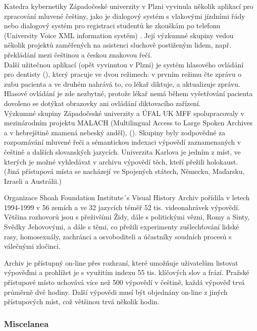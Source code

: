 \begin{multicols}{2}
Katedra kybernetiky Západočeské univerzity v Plzni vyvinula několik aplikací pro zpracování mluvené češtiny, jako je dialogový systém s vlakovými jízdními řády nebo dialogový systém pro registraci studentů ke zkouškám po telefonu (University Voice XML information systém) \cite{Note24}. Její výzkumné skupiny vedou několik projektů zaměřených na asistenci sluchově postiženým lidem, např. překládání mezi češtinou a českou znakovou řečí.\\
Další užitečnou aplikací (opět vyvinutou v Plzni) je systém hlasového ovládání pro dentisty (\cite{Nagy2008}), který pracuje ve dvou režimech: v prvním režimu čte zprávu o zubu pacienta a ve druhém nahrává to, co lékař diktuje, a aktualizuje zprávu. Hlasové ovládání je zde nezbytné, protože lékař nemá během vyšetřování pacienta dovoleno se dotýkat obrazovky ani ovládání diktovacího zařízení.\\
Výzkumné skupiny Západočeské univerzity a ÚFAL UK MFF spolupracovaly v mezinárodním projektu MALACH (Multilingual Access to Large Spoken Archives a v hebrejštině znamená nebeský anděl), (\cite{Psutka2005}). Skupiny byly zodpovědné za rozpoznávání mluvené řeči a sémantickou indexaci výpovědí zaznamenaných v češtině a dalších slovanských jazycích. Univerzita Karlova je jedním z míst, ve kterých je možné vyhledávat v archivu výpovědí těch, kteří přežili holokaust. (Jiná přístupová místa se nacházejí ve Spojených státech, Německu, Maďarsku, Izraeli a Austrálii.)

Organizace Shoah Foundation Institute´s Visual History Archiv pořídila v letech 1994-1999 v 56 zemích a ve 32 jazycích téměř 52 tis. videonahrávek výpovědí. Většina rozhovorů jsou s přeživšími Židy, dále s politickými vězni, Romy a Sinty, Svědky Jehovovými, a dále s těmi, co přežili experimenty zušlechťování lidské rasy, homosexuály, zachránci a osvoboditeli a účastníky soudních procesů s válečnými zločinci.

Archiv je přístupný on-line přes rozhraní, které umožňuje uživatelům listovat výpověďmi a prohlížet je s využitím indexu 55 tis. klíčových slov a  frází. Pražské přístupové místo uchovává více než 500 výpovědí v češtině, každá výpověď trvá průměrně dvě hodiny. Další výpovědi musí být objednány on-line z jiných přístupových míst, což většinou trvá několik hodin.

\subsubsection{Miscelanea}


\end{multicols}
